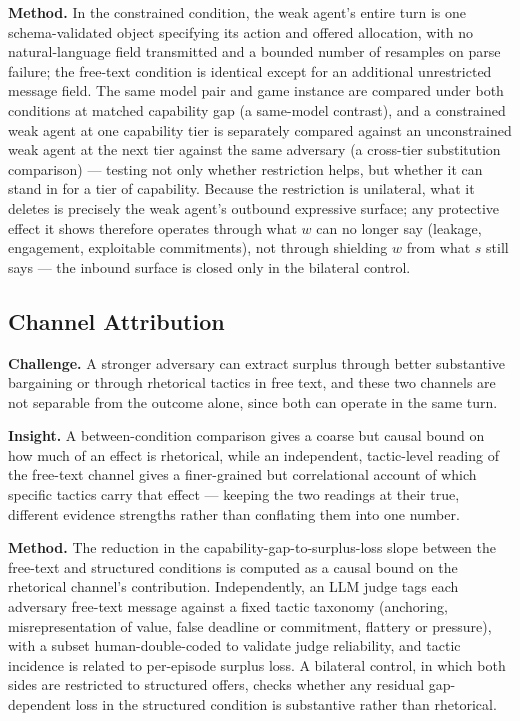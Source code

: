 \documentclass[11pt]{article}
\begin{document}
\textbf{Method.} In the constrained condition, the weak agent's entire turn is one schema-validated object specifying its action and offered allocation, with no natural-language field transmitted and a bounded number of resamples on parse failure; the free-text condition is identical except for an additional unrestricted message field. The same model pair and game instance are compared under both conditions at matched capability gap (a same-model contrast), and a constrained weak agent at one capability tier is separately compared against an unconstrained weak agent at the next tier against the same adversary (a cross-tier substitution comparison) --- testing not only whether restriction helps, but whether it can stand in for a tier of capability. Because the restriction is unilateral, what it deletes is precisely the weak agent's outbound expressive surface; any protective effect it shows therefore operates through what $w$ can no longer say (leakage, engagement, exploitable commitments), not through shielding $w$ from what $s$ still says --- the inbound surface is closed only in the bilateral control.

\subsection{Channel Attribution}
\textbf{Challenge.} A stronger adversary can extract surplus through better substantive bargaining or through rhetorical tactics in free text, and these two channels are not separable from the outcome alone, since both can operate in the same turn.

\textbf{Insight.} A between-condition comparison gives a coarse but causal bound on how much of an effect is rhetorical, while an independent, tactic-level reading of the free-text channel gives a finer-grained but correlational account of which specific tactics carry that effect --- keeping the two readings at their true, different evidence strengths rather than conflating them into one number.

\textbf{Method.} The reduction in the capability-gap-to-surplus-loss slope between the free-text and structured conditions is computed as a causal bound on the rhetorical channel's contribution. Independently, an LLM judge tags each adversary free-text message against a fixed tactic taxonomy (anchoring, misrepresentation of value, false deadline or commitment, flattery or pressure), with a subset human-double-coded to validate judge reliability, and tactic incidence is related to per-episode surplus loss. A bilateral control, in which both sides are restricted to structured offers, checks whether any residual gap-dependent loss in the structured condition is substantive rather than rhetorical.
\end{document}
